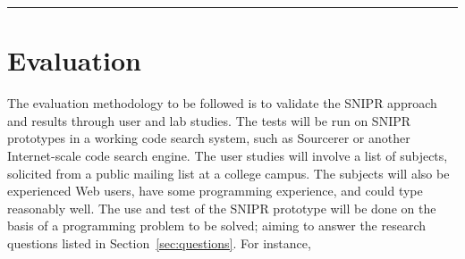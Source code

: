 \fancybreak{\pfbreakdisplay}

\section{Evaluation}
\label{sec:evaluate}

The evaluation methodology to be followed is to validate the \uppercase{SnipR} approach and results through user and lab studies. The tests will be run on \uppercase{SnipR} prototypes in a working code search system, such as Sourcerer\cite{Bajracharya:2006vn} or another Internet-scale code search engine. The user studies will involve a list of subjects, solicited from a public mailing list at a college campus. The subjects will also be experienced Web users, have some programming experience, and could type reasonably well. The use and test of the \uppercase{SnipR} prototype will be done on the basis of a programming problem to be solved; aiming to answer the research questions listed in Section~\ref{sec:questions}. For instance,

